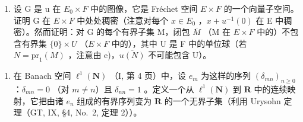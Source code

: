 \begin{enumerate}
\def\labelenumi{\alph{enumi})}
\setcounter{enumi}{5}
\tightlist
\item
  设 G 是 u 在 \(E_{0} \times F\) 中的图像，它是 Fréchet 空间 \(E \times F\) 的一个向量子空间。证明 G 在 \(E \times F\) 中处处稠密（注意对每个 \(x \in E_{0}\) ，\(x + u^{-1}(0)\) 在 E 中稠密）。然而证明：对 G 的每个有界子集 M，闭包 \(\overline{M}\) （M 在 \(E \times F\) 中的）不包含有界集 \(\{0\} \times U\) （\(E \times F\) 中的），其中 U 是 F 中的单位球（若 \(N = \text{pr}_{1}(M)\) ，注意由 e)，\(\overline{u(N)}\) 不可能包含 U）。
\end{enumerate}

\begin{enumerate}
\def\labelenumi{\arabic{enumi})}
\setcounter{enumi}{17}
\tightlist
\item
  在 Banach 空间 \(\ell^1 (\mathbf{N})\) （I, 第 4 页）中，设 \(e_m\) 为这样的序列 \((\delta_{mn})_{n\geq 0}\) ：\(\delta_{mn} = 0\) （对 \(m\neq n\)）且 \(\delta_{nn} = 1\) 。定义一个从 \(\ell^1 (\mathbf{N})\) 到 \(\mathbf{R}\) 中的连续映射，它把由诸 \(e_n\) 组成的有界序列变为 \(\mathbf{R}\) 的一个无界子集（利用 Urysohn 定理（GT, IX, §4, No.~2, 定理 2））。
\end{enumerate}

